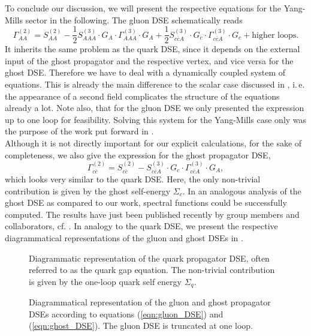 To conclude our discussion, we will present the respective equations for the Yang-Mills sector in the following. The gluon DSE schematically reads
\begin{equation}
\Gamma_{A A}^{(2)}=S_{A A}^{(2)}-\frac{1}{2} S_{A A A}^{(3)} \cdot G_{A} \cdot \Gamma_{A A A}^{(3)} \cdot G_{A}+ \frac{1}{2}S_{c \bar{c} A}^{(3)} \cdot G_{c} \cdot \Gamma_{c \bar{c} A}^{(3)} \cdot G_{c}+ \text{higher loops}.\label{eqn:gluon_DSE}
\end{equation}
It inherits the same problem as the quark DSE, since it depends on the external input of the ghost propagator and the respective vertex, and vice versa for the ghost DSE. Therefore we have to deal with a dynamically coupled system of equations. This is already the main difference to the scalar case discussed in , i.\,e. the appearance of a second field complicates the structure of the equations already a lot. Note also, that for the gluon DSE we only presented the expression up to one loop for feasibility. Solving this system for the Yang-Mills case only was the purpose of the work put forward in \cite{Horak2019}.\\ 
Although it is not directly important for our explicit calculations, for the sake of completeness, we also give the expression for the ghost propagator DSE,
\begin{equation}
\Gamma_{c \bar{c}}^{(2)}=S_{c \bar{c}}^{(2)}-S_{c \bar{c} A}^{(3)} \cdot G_{c} \cdot \Gamma_{c \bar{c} A}^{(3)} \cdot G_{A},\label{eqn:ghost_DSE}
\end{equation}
which looks very similar to the quark DSE. Here, the only non-trivial contribution is given by the ghost self-energy $\Sigma_c$. In an analogous analysis of the ghost DSE as compared to our work, spectral functions could be successfully computed. The results have just been published recently by group members and collaborators, cf. \cite{HorakPapavassiliouPawlowskiWink2021}. In analogy to the quark DSE, we present the respective diagrammatical representations of the gluon and ghost DSEs in .\\

\begin{figure}[t]
\centering

\caption{Diagrammatic representation of the quark propagator DSE, often referred to as the quark gap equation. The non-trivial contribution is given by the one-loop quark self energy $\Sigma_q$.}
\label{fig:quarkDSE}
\end{figure}
\newpage
\begin{figure}[H]
\centering

\caption{Diagrammatical representation of the gluon and ghost propagator DSEs according to equations (\ref{eqn:gluon_DSE}) and (\ref{eqn:ghost_DSE}). The gluon DSE is truncated at one loop.}
\label{fig:YM_DSEs}
\end{figure}

